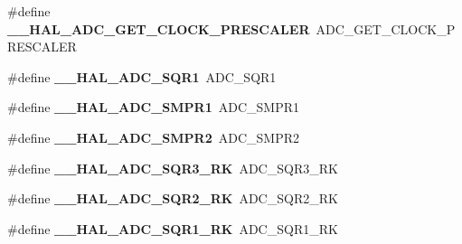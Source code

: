 \begin{DoxyCompactItemize}
\mbox{\label{group___h_a_l___a_d_c___aliased___macros_ga0595fba00a50ea5ba7b8baf4cbdd6820}} 
\#define {\bfseries \+\_\+\+\_\+\+H\+A\+L\+\_\+\+A\+D\+C\+\_\+\+G\+E\+T\+\_\+\+C\+L\+O\+C\+K\+\_\+\+P\+R\+E\+S\+C\+A\+L\+ER}~A\+D\+C\+\_\+\+G\+E\+T\+\_\+\+C\+L\+O\+C\+K\+\_\+\+P\+R\+E\+S\+C\+A\+L\+ER
\item 
\mbox{\label{group___h_a_l___a_d_c___aliased___macros_ga7355b4d9c49af127fdb5a1dd7e8b66f0}} 
\#define {\bfseries \+\_\+\+\_\+\+H\+A\+L\+\_\+\+A\+D\+C\+\_\+\+S\+Q\+R1}~A\+D\+C\+\_\+\+S\+Q\+R1
\item 
\mbox{\label{group___h_a_l___a_d_c___aliased___macros_gad8e081521ef7ee963c7833376f52dbfd}} 
\#define {\bfseries \+\_\+\+\_\+\+H\+A\+L\+\_\+\+A\+D\+C\+\_\+\+S\+M\+P\+R1}~A\+D\+C\+\_\+\+S\+M\+P\+R1
\item 
\mbox{\label{group___h_a_l___a_d_c___aliased___macros_gabd50880ede02b19440d1dbc549b19e8f}} 
\#define {\bfseries \+\_\+\+\_\+\+H\+A\+L\+\_\+\+A\+D\+C\+\_\+\+S\+M\+P\+R2}~A\+D\+C\+\_\+\+S\+M\+P\+R2
\item 
\mbox{\label{group___h_a_l___a_d_c___aliased___macros_ga999c539ac6b3b5ab766461e70dadf0a2}} 
\#define {\bfseries \+\_\+\+\_\+\+H\+A\+L\+\_\+\+A\+D\+C\+\_\+\+S\+Q\+R3\+\_\+\+RK}~A\+D\+C\+\_\+\+S\+Q\+R3\+\_\+\+RK
\item 
\mbox{\label{group___h_a_l___a_d_c___aliased___macros_ga6821ae59c39afefd2644d278974b2ab6}} 
\#define {\bfseries \+\_\+\+\_\+\+H\+A\+L\+\_\+\+A\+D\+C\+\_\+\+S\+Q\+R2\+\_\+\+RK}~A\+D\+C\+\_\+\+S\+Q\+R2\+\_\+\+RK
\item 
\mbox{\label{group___h_a_l___a_d_c___aliased___macros_ga907ae83ff38403071ff564a44d5ad3cb}} 
\#define {\bfseries \+\_\+\+\_\+\+H\+A\+L\+\_\+\+A\+D\+C\+\_\+\+S\+Q\+R1\+\_\+\+RK}~A\+D\+C\+\_\+\+S\+Q\+R1\+\_\+\+RK
\item 
\mbox{\label{group___h_a_l___a_d_c___aliased___macros_ga8b8d36727b15f9d630f633e453c8dc59}} 

\end{DoxyCompactItemize}
